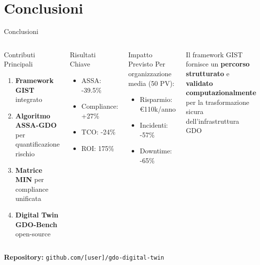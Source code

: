 \documentclass[aspectratio=169,10pt]{beamer}
\begin{document}
\section{Conclusioni}

\begin{frame}{Conclusioni}
\begin{columns}[T]
\begin{block}{Contributi Principali}
\begin{enumerate}
    \item \textbf{Framework GIST} integrato
    \item \textbf{Algoritmo ASSA-GDO} per quantificazione rischio
    \item \textbf{Matrice MIN} per compliance unificata
    \item \textbf{Digital Twin GDO-Bench} open-source
\end{enumerate}
\end{block}

\begin{exampleblock}{Risultati Chiave}
\begin{itemize}
    \item ASSA: \textcolor{gistgreen}{-39.5\%}
    \item Compliance: \textcolor{gistgreen}{+27\%}
    \item TCO: \textcolor{gistgreen}{-24\%}
    \item ROI: \textcolor{gistgreen}{175\%}
\end{itemize}
\end{exampleblock}

\begin{alertblock}{Impatto Previsto}
Per organizzazione media (50 PV):
\begin{itemize}
    \item Risparmio: €110k/anno
    \item Incidenti: -57\%
    \item Downtime: -65\%
\end{itemize}
\end{alertblock}

\begin{tcolorbox}[colback=green!10,colframe=green!50,title=Take-Home Message]
\footnotesize
Il framework GIST fornisce un \textbf{percorso strutturato} e \textbf{validato computazionalmente} per la trasformazione sicura dell'infrastruttura GDO
\end{tcolorbox}
\end{columns}

\vspace{0.5cm}
\begin{center}
\Large\textbf{Repository:} \texttt{github.com/[user]/gdo-digital-twin}
\end{center}
\end{frame}
\end{document}
